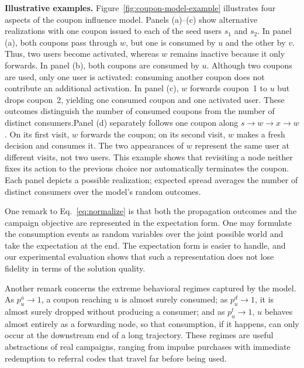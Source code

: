 \documentclass[sigconf]{acmart}
\begin{document}
\textbf{Illustrative examples.}
\textcolor[rgb]{1.00,0.00,0.00}{Figure~\ref{fig:coupon-model-example} illustrates four aspects of the
coupon influence model. Panels (a)--(c) show alternative realizations
with one coupon issued to each of the seed users $s_1$ and $s_2$.
In panel (a), both coupons pass through $w$, but one is consumed by
$u$ and the other by $v$. Thus, two users become activated, whereas
$w$ remains inactive because it only forwards. In panel (b), both
coupons are consumed by $u$. Although two coupons are used, only one
user is activated: consuming another coupon does not contribute an
additional activation. In panel (c), $w$ forwards coupon~1 to $u$
but drops coupon~2, yielding one consumed coupon and one activated
user. These outcomes distinguish the number of consumed coupons from
the number of distinct consumers.Panel (d) separately follows one 
coupon along $s\to w\to x\to w$.
On its first visit, $w$ forwards the coupon; on its second visit, $w$
makes a fresh decision and consumes it. The two appearances of $w$
represent the same user at different visits, not two users.
This example shows that revisiting a node neither fixes its action
to the previous choice nor automatically terminates the coupon.
Each panel depicts a possible realization; expected spread averages
the number of distinct consumers over the model's random outcomes.}




One remark to Eq.~\eqref{eq:normalize} is that both the propagation
outcomes and the campaign objective are represented in the expectation
form.
One may formulate the consumption events as random variables over the
joint possible world and take the expectation at the end.
The expectation form is easier to handle, and our experimental
evaluation shows that such a representation does not lose fidelity in
terms of the solution quality.

Another remark concerns the extreme behavioral regimes captured by
the model.
As $p_u^a\to 1$, a coupon reaching $u$ is almost surely consumed; as
$p_u^d\to 1$, it is almost surely dropped without producing a
consumer; and as $p_u^t\to 1$, $u$ behaves almost entirely as a
forwarding node, so that consumption, if it happens, can only occur
at the downstream end of a long trajectory.
These regimes are useful abstractions of real campaigns, ranging from
impulse purchases with immediate redemption to referral codes that
travel far before being used.
\end{document}

